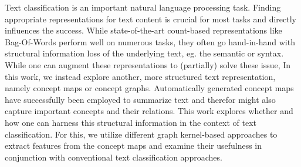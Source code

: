 Text classification is an important natural language processing task. 
Finding appropriate representations for text content is crucial for most tasks and directly influences the success.
While state-of-the-art count-based representations like Bag-Of-Words perform well on numerous tasks, they often go hand-in-hand with structural information loss of the underlying text, eg. the semantic or syntax.
While one can augment these representations to (partially) solve these issue, In this work, we instead explore another, more structured text representation, namely concept maps or concept graphs.
Automatically generated concept maps have successfully been employed to summarize text and therefor might also capture important concepts and their relations.
This work explores whether and how one can harness this structural information in the context of text classification.
For this, we utilize different graph kernel-based approaches to extract features from the concept maps and examine their usefulness in conjunction with conventional text classification approaches.